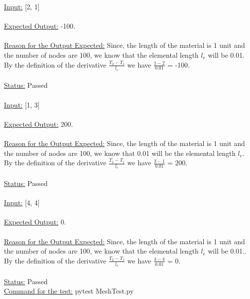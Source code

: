 \noindent \underline{Input:} [2, 1]\\ \\
\underline{Expected Output:} -100.\\ \\
\underline{Reason for the Output Expected:}  Since, the length of the material is 1 unit and the number of nodes are 100, we know that the elemental length $l_e$ will be 0.01. By the definition of the derivative $\frac{T_2-T_1}{l_e}$ we have $\frac{1-2}{0.01}$ = -100.\\ \\
\underline{Status:} Passed\\ \\

\noindent \underline{Input:} [1, 3]\\ \\
\underline{Expected Output:} 200.\\ \\
\underline{Reason for the Output Expected:} Since, the length of the material is 1 unit and the number of nodes are 100, we know that 0.01 will be the elemental length $l_e$. By the definition of the derivative $\frac{T_2-T_1}{l_e}$ we have $\frac{3-1}{0.01}$ = 200.\\ \\
\underline{Status:} Passed\\ \\
\noindent \underline{Input:} [4, 4]\\ \\
\underline{Expected Output:} 0.\\ \\
\underline{Reason for the Output Expected:}  Since, the length of the material is 1 unit and the number of nodes are 100, we know that the elemental length $l_e$ will be 0.01.. By the definition of the derivative $\frac{T_2-T_1}{l_e}$ we have $\frac{4-4}{0.01}$ = 0.\\ \\
\underline{Status:} Passed\\ 
\noindent \underline{Command for the test:} pytest Mesh\textunderscore Test.py\\

